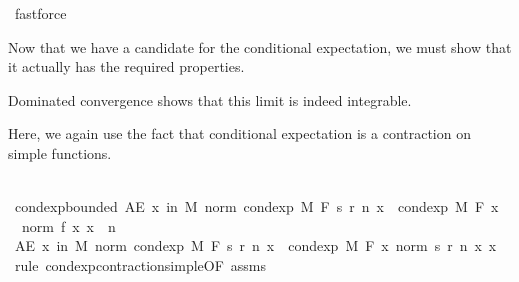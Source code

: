 \begin{isabellebody}
\ fastforce%
\begin{isamarkuptext}%
Now that we have a candidate for the conditional expectation, we must show that it actually has the required properties.%
\end{isamarkuptext}\isamarkuptrue%
%
\begin{isamarkuptext}%
Dominated convergence shows that this limit is indeed integrable.%
\end{isamarkuptext}\isamarkuptrue%
%
\begin{isamarkuptext}%
Here, we again use the fact that conditional expectation is a contraction on simple functions.%
\end{isamarkuptext}\isamarkuptrue%
\ \ \isamarkupfalse%
\ cond{\isacharunderscore}{\kern0pt}exp{\isacharunderscore}{\kern0pt}bounded{\isacharcolon}{\kern0pt}\ {\isachardoublequoteopen}AE\ x\ in\ M{\isachardot}{\kern0pt}\ norm\ {\isacharparenleft}{\kern0pt}cond{\isacharunderscore}{\kern0pt}exp\ M\ F\ {\isacharparenleft}{\kern0pt}s\ {\isacharparenleft}{\kern0pt}r\ n{\isacharparenright}{\kern0pt}{\isacharparenright}{\kern0pt}\ x{\isacharparenright}{\kern0pt}\ {\isasymle}\ cond{\isacharunderscore}{\kern0pt}exp\ M\ F\ {\isacharparenleft}{\kern0pt}{\isasymlambda}x{\isachardot}{\kern0pt}\ {}\ {\isacharasterisk}{\kern0pt}\ norm\ {\isacharparenleft}{\kern0pt}f\ x{\isacharparenright}{\kern0pt}{\isacharparenright}{\kern0pt}\ x{\isachardoublequoteclose}\ \ n\isanewline
\ \ \isamarkupfalse%
\ {\isacharminus}{\kern0pt}\isanewline
\ \ \ \ \isamarkupfalse%
\ {\isachardoublequoteopen}AE\ x\ in\ M{\isachardot}{\kern0pt}\ norm\ {\isacharparenleft}{\kern0pt}cond{\isacharunderscore}{\kern0pt}exp\ M\ F\ {\isacharparenleft}{\kern0pt}s\ {\isacharparenleft}{\kern0pt}r\ n{\isacharparenright}{\kern0pt}{\isacharparenright}{\kern0pt}\ x{\isacharparenright}{\kern0pt}\ {\isasymle}\ cond{\isacharunderscore}{\kern0pt}exp\ M\ F\ {\isacharparenleft}{\kern0pt}{\isasymlambda}x{\isachardot}{\kern0pt}\ norm\ {\isacharparenleft}{\kern0pt}s\ {\isacharparenleft}{\kern0pt}r\ n{\isacharparenright}{\kern0pt}\ x{\isacharparenright}{\kern0pt}{\isacharparenright}{\kern0pt}\ x{\isachardoublequoteclose}\ \isamarkupfalse%
\ {\isacharparenleft}{\kern0pt}rule\ cond{\isacharunderscore}{\kern0pt}exp{\isacharunderscore}{\kern0pt}contraction{\isacharunderscore}{\kern0pt}simple{\isacharbrackleft}{\kern0pt}OF\ assms{\isacharparenleft}{\kern0pt}{}{\isacharcomma}{\kern0pt}{}{\isacharparenright}{\kern0pt}{\isacharbrackright}{\kern0pt}{\isacharparenright}{\kern0pt}\isanewline

\end{isabellebody}
